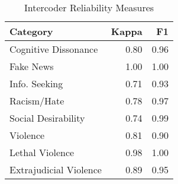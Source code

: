 \begin{table}[ht]
\centering
\caption{Intercoder Reliability Measures} 
\begin{tabular}{lrr}
  \hline
Category & Kappa & F1 \\ 
  \hline
Cognitive Dissonance & 0.80 & 0.96 \\ 
  Fake News & 1.00 & 1.00 \\ 
  Info. Seeking & 0.71 & 0.93 \\ 
  Racism/Hate & 0.78 & 0.97 \\ 
  Social Desirability & 0.74 & 0.99 \\ 
  Violence & 0.81 & 0.90 \\ 
  Lethal Violence & 0.98 & 1.00 \\ 
  Extrajudicial Violence & 0.89 & 0.95 \\ 
   \hline
\end{tabular}
\end{table}
